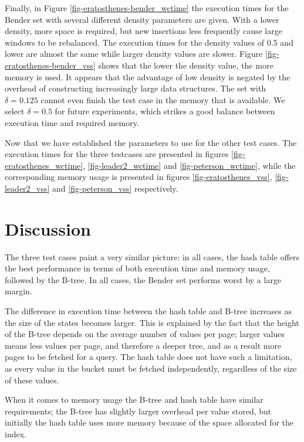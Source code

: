 \documentclass{acm_proc_article-sp}
\begin{document}
Finally, in Figure \ref{fig-eratosthenes-bender_wctime} the execution times for
the Bender set with several different density parameters are given. With a lower
density, more space is required, but new insertions less frequently cause large windows to be rebalanced.
The execution times for the density values of 0.5 and lower are almost the same
while larger density values are slower.
Figure \ref{fig-eratosthenes-bender_vss} shows that the lower the density value,
the more memory is used. It appears that the advantage of low density is
negated by the overhead of constructing increasingly large data structures.
The set with $\delta=0.125$ cannot even finish the test case in the memory
that is available. We select $\delta=0.5$ for future experiments, which strikes
a good balance between execution time and required memory.


Now that we have established the parameters to use for the other test cases.
The execution times for the three testcases are presented in figures
\ref{fig-eratosthenes_wctime}, \ref{fig-leader2_wctime} and
\ref{fig-peterson_wctime}, while the corresponding memory usage is presented in
figures \ref{fig-eratosthenes_vss}, \ref{fig-leader2_vss} and \ref{fig-peterson_vss} respectively.

\section{Discussion}
The three test cases paint a very similar picture: in all cases, the hash table
offers the best performance in terms of both execution time and memory usage,
followed by the B-tree. In all cases, the Bender set performs worst by a large
margin.

The difference in execution time between the hash table and B-tree increases as
the size of the states becomes larger. This is explained by the fact that the
height of the B-tree depends on the average number of values per page; larger
values means less values per page, and therefore a deeper tree, and as a
result more pages to be fetched for a query. The hash table does not have such a
limitation, as every value in the bucket must be fetched independently, regardless
of the size of these values.

When it comes to memory usage the B-tree and hash table have similar requirements;
the B-tree has slightly larger overhead per value stored, but initially the hash
table uses more memory because of the space allocated for the index.
\end{document}
